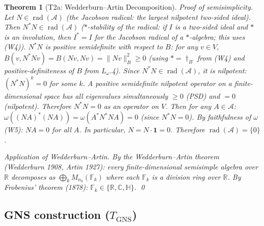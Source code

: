 \documentclass[11pt,a4paper]{article}
\newtheorem{theorem}{Theorem}[section]
\theoremstyle{definition}
\DeclareMathOperator{\rad}{rad}
\begin{document}
\begin{theorem}[T2a: Wedderburn--Artin Decomposition]
\noindent\textit{Proof of semisimplicity.}  Let $N \in \rad(\mathcal{A})$ (the Jacobson radical: the largest nilpotent two-sided ideal).  Then $N^*N \in \rad(\mathcal{A})$ ($*$-stability of the radical: if $I$ is a two-sided ideal and $*$ is an involution, then $I^* = I$ for the Jacobson radical of a $*$-algebra; this uses (W4)).  $N^*N$ is positive semidefinite with respect to $B$: for any $v \in V$, $B(v, N^*N v) = B(Nv, Nv) = \|Nv\|_B^2 \ge 0$ (using $* = \dagger_B$ from (W4) and positive-definiteness of $B$ from $L_\omega$.4).  Since $N^*N \in \rad(\mathcal{A})$, it is nilpotent: $(N^*N)^k = 0$ for some $k$.  A positive semidefinite nilpotent operator on a finite-dimensional space has all eigenvalues simultaneously $\ge 0$ (PSD) and $= 0$ (nilpotent).  Therefore $N^*N = 0$ as an operator on $V$.  Then for any $A \in \mathcal{A}$: $\omega((NA)^*(NA)) = \omega(A^*N^*NA) = 0$ (since $N^*N = 0$).  By faithfulness of $\omega$ (W5): $NA = 0$ for all $A$.  In particular, $N = N \cdot \mathbf{1} = 0$.  Therefore $\rad(\mathcal{A}) = \{0\}$.

\smallskip\noindent\textit{Application of Wedderburn--Artin.}
By the Wedderburn--Artin theorem (Wedderburn 1908, Artin 1927): every finite-dimensional semisimple algebra over $\mathbb{R}$ decomposes as $\bigoplus_k M_{n_k}(\mathbb{F}_k)$ where each $\mathbb{F}_k$ is a division ring over $\mathbb{R}$.  By Frobenius' theorem (1878): $\mathbb{F}_k \in \{\mathbb{R}, \mathbb{C}, \mathbb{H}\}$.  \qed
\end{theorem}

\subsection{GNS construction ($T_{\mathrm{GNS}}$)}
\end{document}
